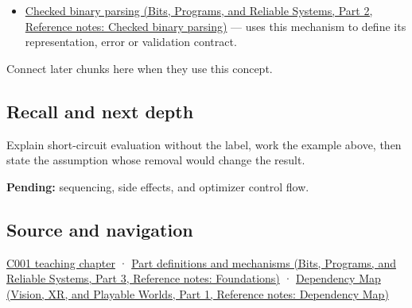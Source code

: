 \hypertarget{appendix-2e245a6fa8d3-used-by}{}

\begin{itemize}
\tightlist
\item
  \href{../01-Bits-Programs-and-Reliable-Systems-P02/main.pdf\#nameddest=appendix-652d81568de9}{Checked binary parsing (Bits, Programs, and Reliable Systems, Part 2, Reference notes: Checked binary parsing)} --- uses this mechanism to define its representation, error or validation contract.
\end{itemize}

Connect later chunks here when they use this concept.

\subsection{Recall and next depth}\label{appendix-2e245a6fa8d3-recall-and-next-depth}

\hypertarget{appendix-2e245a6fa8d3-recall-and-next-depth}{}

Explain short-circuit evaluation without the label, work the example above, then state the assumption whose removal would change the result.

\textbf{Pending:} sequencing, side effects, and optimizer control flow.

\subsection{Source and navigation}\label{appendix-2e245a6fa8d3-source-and-navigation}

\hypertarget{appendix-2e245a6fa8d3-source-and-navigation}{}

\hyperref[01-foundations-i-ch001-from-a-signal-to-an-interpretation]{C001 teaching chapter} · \href{../01-Bits-Programs-and-Reliable-Systems-P03/main.pdf\#nameddest=appendix-fd090d982a15}{Part definitions and mechanisms (Bits, Programs, and Reliable Systems, Part 3, Reference notes: Foundations)} · \href{../07-Vision-XR-and-Playable-Worlds-P01/main.pdf\#nameddest=appendix-4ad47bdd269a}{Dependency Map (Vision, XR, and Playable Worlds, Part 1, Reference notes: Dependency Map)}
